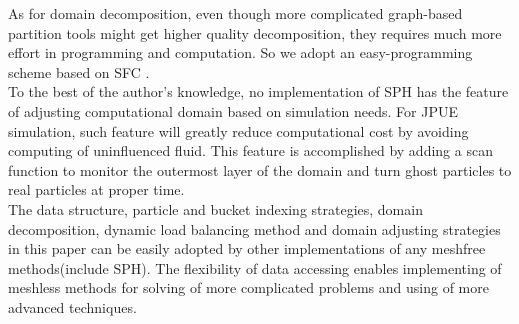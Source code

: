\documentclass[conference,compsoc]{IEEEtran}
\begin{document}
As for domain decomposition, even though more complicated graph-based partition tools\cite{biswas1999experiments} might get higher quality decomposition, they requires much more effort in programming and computation. So we adopt an easy-programming scheme based on SFC \cite{patra1999efficient}.\\
To the best of the author's knowledge, no implementation of SPH has the feature of adjusting computational domain based on simulation needs. For JPUE simulation, such feature will greatly reduce computational cost by avoiding computing of uninfluenced fluid. This feature is accomplished by adding a scan function to monitor the outermost layer of the domain and turn ghost particles to real particles at proper time.\\
The data structure, particle and bucket indexing strategies, domain decomposition, dynamic load balancing method and domain adjusting strategies in this paper can be easily adopted by other implementations of any meshfree methods(include SPH). The flexibility of data accessing enables implementing of meshless methods for solving of more complicated problems and using of more advanced techniques.
\end{document}
